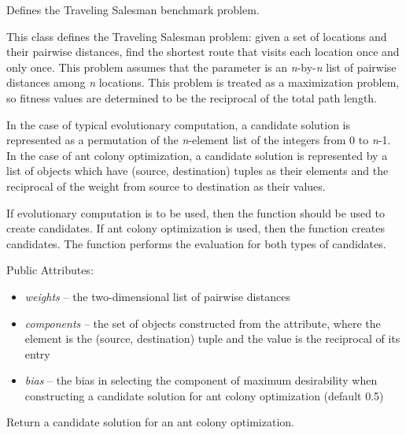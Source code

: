 \documentclass[letterpaper,10pt,english]{sphinxmanual}
\begin{document}
\begin{fulllineitems}
\label{reference:inspyred.benchmarks.TSP}
Defines the Traveling Salesman benchmark problem.

This class defines the Traveling Salesman problem: given a set of
locations and their pairwise distances, find the shortest route that
visits each location once and only once. This problem assumes that 
the  parameter is an \emph{n}-by-\emph{n} list of pairwise 
distances among \emph{n} locations. This problem is treated as a 
maximization problem, so fitness values are determined to be the 
reciprocal of the total path length.

In the case of typical evolutionary computation, a candidate solution
is represented as a permutation of the \emph{n}-element list of the integers 
from 0 to \emph{n}-1. In the case of ant colony optimization, a candidate
solution is represented by a list of  objects which
have (source, destination) tuples as their elements and the reciprocal
of the weight from source to destination as their values.

If evolutionary computation is to be used, then the  
function should be used to create candidates. If ant colony 
optimization is used, then the  function creates 
candidates. The  function performs the evaluation for 
both types of candidates.

Public Attributes:
\begin{itemize}
\item {} 
\emph{weights} -- the two-dimensional list of pairwise distances

\item {} 
\emph{components} -- the set of  objects constructed
from the  attribute, where the element is the (source,
destination) tuple and the value is the reciprocal of its 
 entry

\item {} 
\emph{bias} -- the bias in selecting the component of maximum desirability
when constructing a candidate solution for ant colony optimization 
(default 0.5)

\end{itemize}

\begin{fulllineitems}
\label{reference:inspyred.benchmarks.TSP.constructor}
Return a candidate solution for an ant colony optimization.


\end{fulllineitems}
\end{fulllineitems}
\end{document}

